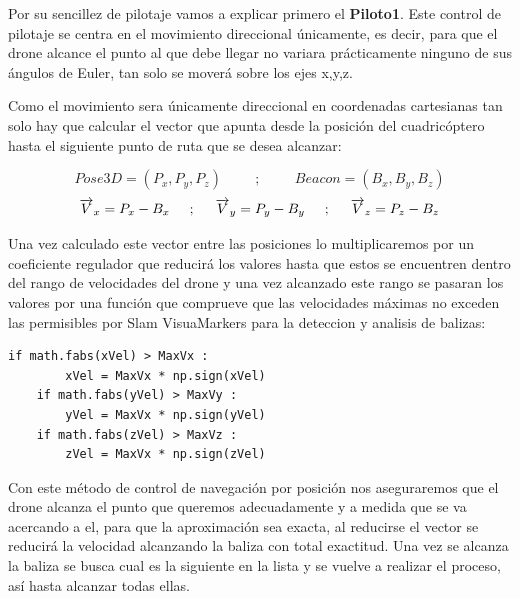 \hspace{1cm} Por su sencillez de pilotaje vamos a explicar primero el \textbf{Piloto1}. Este control de pilotaje se centra en el movimiento direccional únicamente, es decir, para que el drone alcance el punto al que debe llegar no variara prácticamente ninguno de sus ángulos de Euler, tan solo se moverá sobre los ejes x,y,z.

\hspace{1cm} Como el movimiento sera únicamente direccional en coordenadas cartesianas tan solo hay que calcular el vector que apunta desde la posición del cuadricóptero hasta el siguiente punto de ruta que se desea alcanzar: 

\[Pose3D = (P_{x}, P_{y}, P_{z})\hspace{1cm};\hspace{1cm}Beacon = (B_{x}, B_{y}, B_{z})\]
\[\overrightarrow{V}_{x} = P_{x} - B_{x}\hspace{0.5cm};\hspace{0.5cm}\overrightarrow{V}_{y} = P_{y} - B_{y}\hspace{0.5cm};\hspace{0.5cm}\overrightarrow{V}_{z} = P_{z} - B_{z}\]

\hspace{1cm} Una vez calculado este vector entre las posiciones lo multiplicaremos por un coeficiente regulador que reducirá los valores hasta que estos se encuentren dentro del rango de velocidades del drone y una vez alcanzado este rango se pasaran los valores por una función que comprueve que las velocidades máximas no exceden las permisibles por Slam VisuaMarkers para la deteccion y analisis de balizas: 

\begin{lstlisting}[backgroundcolor=\color{gray!15}]
    if math.fabs(xVel) > MaxVx :
        xVel = MaxVx * np.sign(xVel)
    if math.fabs(yVel) > MaxVy :
        yVel = MaxVx * np.sign(yVel)
    if math.fabs(zVel) > MaxVz :
        zVel = MaxVx * np.sign(zVel)        
\end{lstlisting}

\hspace{1cm} Con este método de control de navegación por posición nos aseguraremos que el drone alcanza el punto que queremos adecuadamente y a medida que se va acercando a el, para que la aproximación sea exacta, al reducirse el vector se reducirá la velocidad alcanzando la baliza con total exactitud. Una vez se alcanza la baliza se busca cual es la siguiente en la lista y se vuelve a realizar el proceso, así hasta alcanzar todas ellas.


